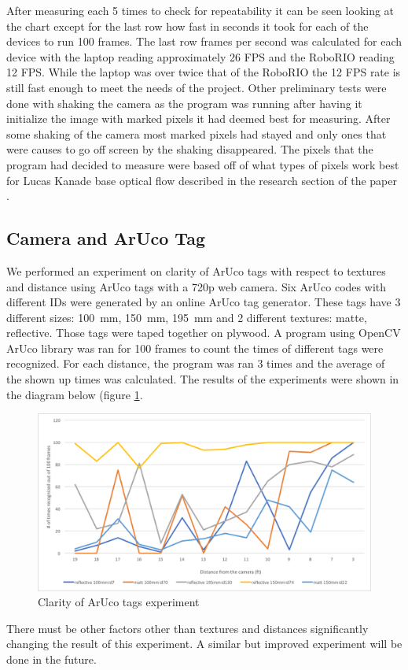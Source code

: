 \documentclass{article}
\begin{document}
	After measuring each 5 times to check for repeatability it can be seen looking at the chart except for the last row how fast in seconds it took for each of the devices to run 100 frames. The last row frames per second was calculated for each device with the laptop reading approximately 26 FPS and the RoboRIO reading 12 FPS. While the laptop was over twice that of the RoboRIO the 12 FPS rate is still fast enough to meet the needs of the project. Other preliminary tests were done with shaking the camera as the program was running after having it initialize the image with marked pixels it had deemed best for measuring. After some shaking of the camera most marked pixels had stayed and only ones that were causes to go off screen by the shaking disappeared. The pixels that the program had decided to measure were based off of what types of pixels work best for Lucas Kanade base optical flow described in the research section of the paper		.

    \subsection{Camera and ArUco Tag}
    	We performed an experiment on clarity of ArUco tags with respect to textures and distance using ArUco tags with a 720p web camera. Six ArUco codes with different IDs were generated by an online ArUco tag generator. These tags have 3 different sizes: \SI{100}{\milli\meter}, \SI{150}{\milli\meter}, \SI{195}{\milli\meter} and 2 different textures: matte, reflective. Those tags were taped together on plywood.
A program using OpenCV ArUco library was ran for 100 frames to count the times of different tags were recognized. For each distance, the program was ran 3 times and the average of the shown up times was calculated. The results of the experiments were shown in the diagram below (figure \ref{fig:aruco_clarity}.

    \begin{figure}[H]
      \centering
      \includegraphics[width=1\linewidth]{./images/camera_aterm_experiment.png}
      \caption{Clarity of ArUco tags experiment}
      \label{fig:aruco_clarity}
    \end{figure}
    There must be other factors other than textures and distances significantly changing the result of this experiment. A similar but improved experiment will be done in the future.
\end{document}
